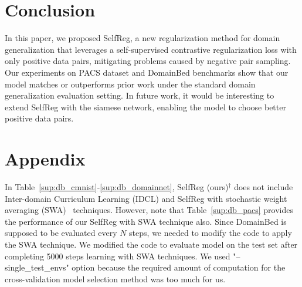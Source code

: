 \documentclass[10pt,twocolumn,letterpaper]{article}
\begin{document}
\section{Conclusion}
In this paper, we proposed SelfReg, a new regularization method for domain generalization that leverages a self-supervised contrastive regularization loss with only positive data pairs, mitigating  problems caused by negative pair sampling.  Our experiments on PACS dataset and DomainBed benchmarks show that our model matches or outperforms prior work under the standard domain generalization evaluation setting.  In future work, it would be interesting to extend SelfReg with the siamese network, enabling the model to choose better positive data pairs.



{


}
\newpage


\section*{Appendix}
In Table~\ref{sup:db_cmnist}-\ref{sup:db_domainnet}, SelfReg (ours)$^{\dagger}$ does not include Inter-domain Curriculum Learning (IDCL) and SelfReg with stochastic weight averaging (SWA)~\cite{izmailov2018averaging} techniques. However, note that Table~\ref{sup:db_pacs} provides the performance of our SelfReg with SWA technique also. Since DomainBed is supposed to be evaluated every $N$ steps, we needed to modify the code to apply the SWA technique. We modified the code to evaluate model on the test set after completing 5000 steps learning with SWA techniques. We used "--single\_test\_envs" option because the required amount of computation for the cross-validation model selection method was too much for us.
\end{document}

